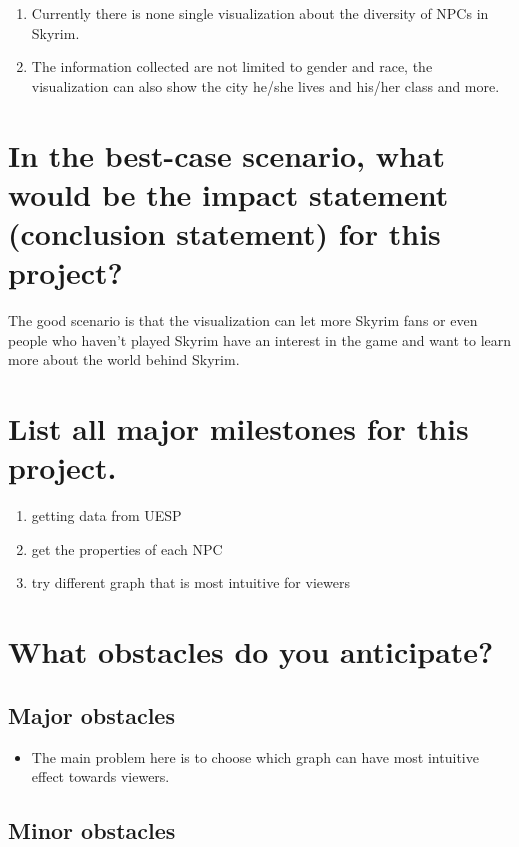 \documentclass{proc}
\begin{document}
\begin{enumerate}
\item Currently there is none single visualization about the diversity of NPCs in Skyrim.
\item The information collected are not limited to gender and race, the visualization can also show the city he/she lives and his/her class and more.
\end{enumerate}


\section{In the best-case scenario, what would be the impact statement (conclusion statement) for this project?  } 

The good scenario is that the visualization can let more Skyrim fans or even people who haven't played Skyrim have an interest in the game and want to learn more about the world behind Skyrim.


\section{List all major milestones for this project.}

\begin{enumerate}
  \item getting data from UESP
  \item get the properties of each NPC
  \item try different graph that is most intuitive for viewers

\end{enumerate}

\section{What obstacles do you anticipate?}

\subsection{Major obstacles} 

\begin{itemize}
  \item The main problem here is to choose which graph can have most intuitive effect towards viewers.
\end{itemize}

\subsection{Minor obstacles}
\end{document}
